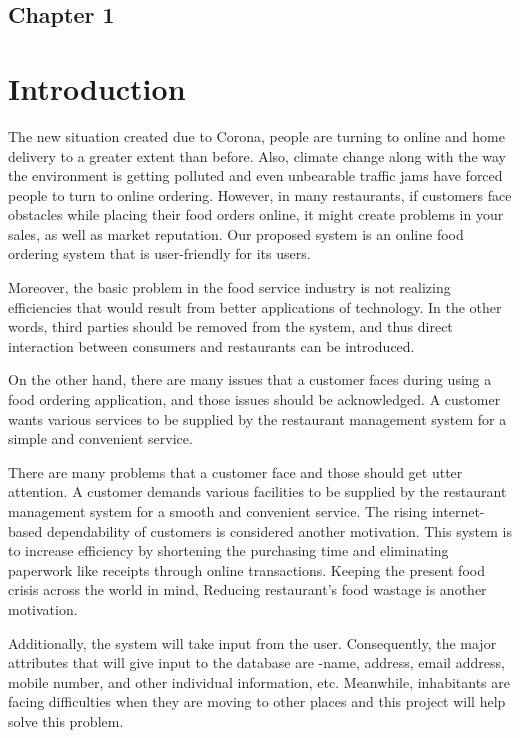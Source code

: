 \begin{center}
    \section*{\fontsize{20}{20}\selectfont Chapter 1}
\end{center}
\vspace{5mm}
\section{Introduction}
The new situation created due to Corona, people are turning to online and home delivery to a greater extent than before. Also, climate change along with the way the environment is getting polluted and even unbearable traffic jams have forced people to turn to online ordering. However, in many restaurants, if customers face obstacles while placing their food orders online, it might create problems in your sales, as well as market reputation. Our proposed system is an online food ordering system that is user-friendly for its users.

 Moreover, the basic problem in the food service industry is not realizing efficiencies that would result from better applications of technology. In the other words, third parties should be removed from the system, and thus direct interaction between consumers and restaurants can be introduced.
 
On the other hand, there are many issues that a customer faces during using a food ordering application, and those issues should be acknowledged. A customer wants various services to be supplied by the restaurant management system for a simple and convenient service.

There are many problems that a customer face and those should get utter attention. A customer demands various facilities to be supplied by the restaurant management system for a smooth and convenient service. The rising internet-based dependability of customers is considered another motivation. This system is to increase efficiency by shortening the purchasing time and eliminating paperwork like receipts through online transactions. Keeping the present food crisis across the world in mind, Reducing restaurant's food wastage is another motivation.

Additionally, the system will take input from the user. Consequently, the major attributes that will give input to the database are -name, address, email address, mobile number, and other individual information, etc. Meanwhile, inhabitants are facing difficulties when they are moving to other places and this project will help solve this problem.

